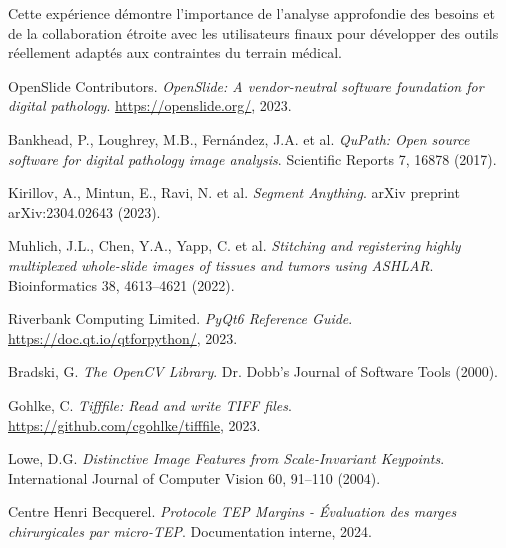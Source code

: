 \documentclass[11pt,a4paper]{report}
\begin{document}
Cette expérience démontre l'importance de l'analyse approfondie des besoins et de la collaboration étroite avec les utilisateurs finaux pour développer des outils réellement adaptés aux contraintes du terrain médical.

\newpage

\begin{thebibliography}{9}

OpenSlide Contributors. \textit{OpenSlide: A vendor-neutral software foundation for digital pathology}. 
\url{https://openslide.org/}, 2023.

Bankhead, P., Loughrey, M.B., Fernández, J.A. et al. 
\textit{QuPath: Open source software for digital pathology image analysis}. 
Scientific Reports 7, 16878 (2017).

Kirillov, A., Mintun, E., Ravi, N. et al. 
\textit{Segment Anything}. 
arXiv preprint arXiv:2304.02643 (2023).

Muhlich, J.L., Chen, Y.A., Yapp, C. et al. 
\textit{Stitching and registering highly multiplexed whole-slide images of tissues and tumors using ASHLAR}. 
Bioinformatics 38, 4613–4621 (2022).

Riverbank Computing Limited. 
\textit{PyQt6 Reference Guide}. 
\url{https://doc.qt.io/qtforpython/}, 2023.

Bradski, G. 
\textit{The OpenCV Library}. 
Dr. Dobb's Journal of Software Tools (2000).

Gohlke, C. 
\textit{Tifffile: Read and write TIFF files}. 
\url{https://github.com/cgohlke/tifffile}, 2023.

Lowe, D.G. 
\textit{Distinctive Image Features from Scale-Invariant Keypoints}. 
International Journal of Computer Vision 60, 91–110 (2004).

Centre Henri Becquerel. 
\textit{Protocole TEP Margins - Évaluation des marges chirurgicales par micro-TEP}. 
Documentation interne, 2024.

\end{thebibliography}
\end{document}
